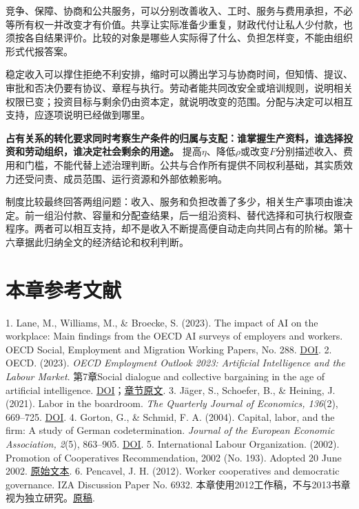 \documentclass[UTF8,fontset=windows,12pt,a4paper,oneside,openany]{ctexbook}
\begin{document}
竞争、保障、协商和公共服务，可以分别改善收入、工时、服务与费用承担，不必等所有权一并改变才有价值。共享让实际准备少重复，财政代付让私人少付款，也须按各自结果评价。比较的对象是哪些人实际得了什么、负担怎样变，不能由组织形式代报答案。

稳定收入可以撑住拒绝不利安排，缩时可以腾出学习与协商时间，但知情、提议、审批和否决仍要有协议、章程与执行。劳动者能共同改安全或培训规则，说明相关权限已变；投资目标与剩余仍由资本定，就说明改变的范围。分配与决定可以相互支持，应逐项说明已经做到哪里。

\textbf{占有关系的转化要求同时考察生产条件的归属与支配：谁掌握生产资料，谁选择投资和劳动组织，谁决定社会剩余的用途。} 提高$\eta$、降低$\rho$或改变$F$分别描述收入、费用和门槛，不能代替上述治理判断。公共与合作所有提供不同权利基础，其实质效力还受问责、成员范围、运行资源和外部依赖影响。

制度比较最终回答两组问题：收入、服务和负担改善了多少，相关生产事项由谁决定。前一组沿付款、容量和分配查结果，后一组沿资料、替代选择和可执行权限查程序。两者可以相互支持，却不是收入不断提高便自动走向共同占有的阶梯。第十六章据此归纳全文的经济结论和权利判断。

\section*{本章参考文献}

1. Lane, M., Williams, M., \& Broecke, S. (2023). The impact of AI on the workplace: Main findings from the OECD AI surveys of employers and workers. OECD Social, Employment and Migration Working Papers, No. 288. \href{https://doi.org/10.1787/ea0a0fe1-en}{DOI}.
2. OECD. (2023). \emph{OECD Employment Outlook 2023: Artificial Intelligence and the Labour Market}. 第7章Social dialogue and collective bargaining in the age of artificial intelligence. \href{https://doi.org/10.1787/08785bba-en}{DOI}；\href{https://www.oecd.org/en/publications/2023/07/oecd-employment-outlook-2023_904bcef3/full-report/social-dialogue-and-collective-bargaining-in-the-age-of-artificial-intelligence_5828691a.html}{章节原文}.
3. Jäger, S., Schoefer, B., \& Heining, J. (2021). Labor in the boardroom. \emph{The Quarterly Journal of Economics, 136}(2), 669–725. \href{https://doi.org/10.1093/qje/qjaa038}{DOI}.
4. Gorton, G., \& Schmid, F. A. (2004). Capital, labor, and the firm: A study of German codetermination. \emph{Journal of the European Economic Association, 2}(5), 863–905. \href{https://doi.org/10.1162/1542476042782260}{DOI}.
5. International Labour Organization. (2002). Promotion of Cooperatives Recommendation, 2002 (No. 193). Adopted 20 June 2002. \href{https://webapps.ilo.org/public/english/standards/relm/ilc/ilc90/pdf/rec-193.pdf}{原始文本}.
6. Pencavel, J. H. (2012). Worker cooperatives and democratic governance. IZA Discussion Paper No. 6932. 本章使用2012工作稿，不与2013书章视为独立研究。\href{https://docs.iza.org/dp6932.pdf}{原稿}.
\end{document}
